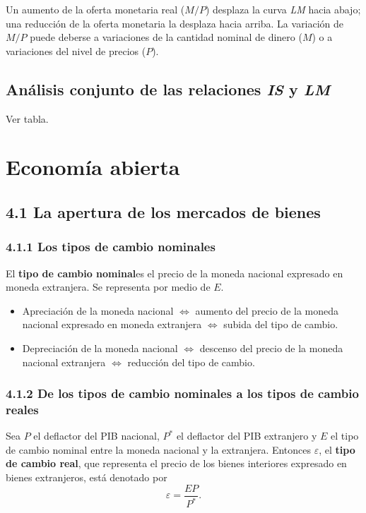 \documentclass[10pt, landscape]{article}
\begin{document}
\begin{multicols*}{3}
Un aumento de la oferta monetaria real ($M/P$) desplaza la curva \textit{LM} hacia abajo; una reducción de la oferta monetaria la desplaza hacia arriba. La variación de $M/P$ puede deberse a variaciones de la cantidad nominal de dinero ($M$) o a variaciones del nivel de precios ($P$).

\subsection{Análisis conjunto de las relaciones \textit{IS} y \textit{LM}}
Ver tabla.

\section{Economía abierta}

\subsection{4.1 La apertura de los mercados de bienes}
\subsubsection{4.1.1 Los tipos de cambio nominales}
El \textbf{tipo de cambio nominal}es el precio de la moneda nacional expresado en moneda extranjera. Se representa por medio de $E$.

\begin{itemize}
    \item Apreciación de la moneda nacional $\iff$ aumento del precio de la moneda nacional expresado en moneda extranjera $\iff$ subida del tipo de cambio.
    \item Depreciación de la moneda nacional $\iff$ descenso del precio de la moneda nacional extranjera $\iff$ reducción del tipo de cambio.
\end{itemize}

\subsubsection{4.1.2 De los tipos de cambio nominales a  los tipos de cambio reales}
Sea $P$ el deflactor del PIB nacional, $P^*$ el deflactor del PIB extranjero y $E$ el tipo de cambio nominal entre la moneda nacional y la extranjera. Entonces $\varepsilon$, el \textbf{tipo de cambio real}, que representa el precio de los bienes interiores expresado en bienes extranjeros, está denotado por
$$ \varepsilon = \frac{EP}{P^*}. $$


\end{multicols*}
\end{document}
